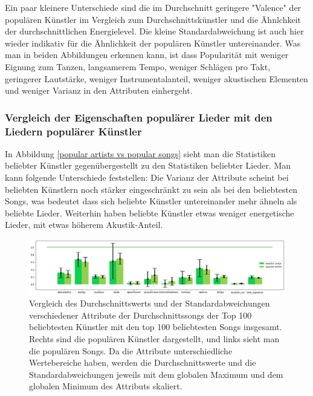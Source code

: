 \documentclass[conference]{IEEEtran}
\begin{document}
Ein paar kleinere Unterschiede sind die im Durchschnitt geringere "Valence" der populären Künstler im Vergleich zum Durchschnittskünstler und die Ähnlchkeit der durchschnittlichen Energielevel. Die kleine Standardabweichung ist auch hier wieder indikativ für die Ähnlichkeit der populären Künstler untereinander.
Was man in beiden Abbildungen erkennen kann, ist dass Popularität mit weniger Eignung zum Tanzen, langsamerem Tempo, weniger Schlägen pro Takt, geringerer Lautstärke, weniger Instrumentalanteil, weniger akustischen Elementen und weniger Varianz in den Attributen einhergeht.

\subsubsection{Vergleich der Eigenschaften populärer Lieder mit den Liedern populärer Künstler}
In Abbildung \eqref{popular artists vs popular songs} sieht man die Statistiken beliebter Künstler gegenübergestellt zu den Statistiken beliebter Lieder. Man kann folgende Unterschiede feststellen: Die Varianz der Attribute scheint bei beliebten Künstlern noch stärker eingeschränkt zu sein als bei den beliebtesten Songs, was bedeutet dass sich beliebte Künstler untereinander mehr ähneln als beliebte Lieder. Weiterhin haben beliebte Künstler etwas weniger energetische Lieder, mit etwas höherem Akustik-Anteil.

\begin{figure}[t]
\centering
\includegraphics[width=\textwidth]{images/tracks_arts.png}
\caption{Vergleich des Durchschnittswerts und der Standardabweichungen verschiedener Attribute der Durchschnittssongs der Top 100 beliebtesten Künstler mit den top 100 beliebtesten Songs insgesamt. Rechts sind die populären Künstler dargestellt, und links sieht man die populären Songs. Da die Attribute unterschiedliche Wertebereiche haben, werden die Durchschnittswerte und die Standardabweichungen jeweils mit dem globalen Maximum und dem globalen Minimum des Attributs skaliert.}
\label{popular artists vs popular songs}
\end{figure}
\end{document}
